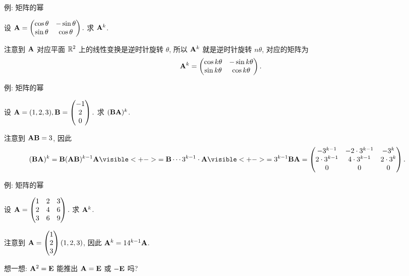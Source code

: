 \begin{frame}{例: 矩阵的幂}
	\onslide<+->
	\begin{example}
		设
		${\mathbf{A}}=\begin{pmatrix}
			\cos\theta&-\sin\theta\\
			\sin\theta&\cos\theta
		\end{pmatrix}.$
		求 ${\mathbf{A}}^k$.
	\end{example}
	\onslide<+->
	\begin{solution}
		注意到 ${\mathbf{A}}$ 对应平面 ${\mathbb{R}}^2$ 上的线性变换是逆时针旋转 $\theta$, 所以 ${\mathbf{A}}^k$ 就是逆时针旋转 $n\theta$, 对应的矩阵为
		\[{\mathbf{A}}^k=\begin{pmatrix}
			\cos k\theta&-\sin k\theta\\
			\sin k\theta&\cos k\theta
		\end{pmatrix}.\]
	\end{solution}
\end{frame}


\begin{frame}{例: 矩阵的幂}
	\onslide<+->
	\begin{example}
		设 
		${\mathbf{A}}=(1,2,3),{\mathbf{B}}=\begin{pmatrix}
			-1\\2\\0
		\end{pmatrix}.$
		求 $({\mathbf{B}}{\mathbf{A}})^k$.
	\end{example}
	\onslide<+->
	\begin{solution}
		注意到 ${\mathbf{A}}{\mathbf{B}}=3$, 因此
		\begin{align*}
			(\bfB\bfA)^k&=\bfB(\bfA\bfB)^{k-1}\bfA
			\visible<+->{=\bfB\cdots 3^{k-1}\cdot \bfA}
			\visible<+->{=3^{k-1}\bfB\bfA=\begin{pmatrix}
				-3^{k-1}&-2\cdot 3^{k-1}&-3^k\\
				2\cdot 3^{k-1}&4\cdot 3^{k-1}&2\cdot3^{k}\\
				0&0&0
			\end{pmatrix}.}
		\end{align*}
	\end{solution}
\end{frame}


\begin{frame}{例: 矩阵的幂}
	\onslide<+->
	\begin{exercise}
		设 
		${\mathbf{A}}=\begin{pmatrix}
			1&2&3\\
			2&4&6\\
			3&6&9
		\end{pmatrix}.$
		求 ${\mathbf{A}}^k$.
	\end{exercise}
	\onslide<+->
	\begin{answer}
		注意到 ${\mathbf{A}}=\begin{pmatrix}
			1\\2\\3
		\end{pmatrix}(1,2,3)$, 因此 ${\mathbf{A}}^k=14^{k-1}{\mathbf{A}}$.
	\end{answer}
	\onslide<+->
	想一想: ${\mathbf{A}}^2={\mathbf{E}}$ 能推出 ${\mathbf{A}}={\mathbf{E}}$ 或 $-{\mathbf{E}}$ 吗?
\end{frame}


